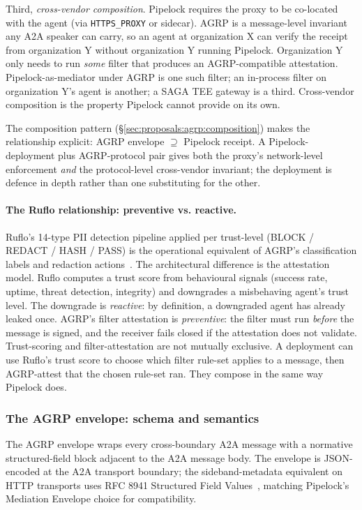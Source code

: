Third, \emph{cross-vendor composition}. Pipelock requires
the proxy to be co-located with the agent (via
\texttt{HTTPS\_PROXY} or sidecar). AGRP is a message-level
invariant any A2A speaker can carry, so an agent at
organization X can verify the receipt from organization
Y without organization Y running Pipelock. Organization Y
only needs to run \emph{some} filter that produces an
AGRP-compatible attestation. Pipelock-as-mediator under
AGRP is one such filter; an in-process filter on
organization Y's agent is another; a SAGA TEE gateway is
a third. Cross-vendor composition is the property
Pipelock cannot provide on its own.

The composition pattern (\S\ref{sec:proposals:agrp:composition})
makes the relationship explicit: AGRP envelope
$\supseteq$ Pipelock receipt. A
Pipelock-deployment plus AGRP-protocol pair gives both
the proxy's network-level enforcement \emph{and} the
protocol-level cross-vendor invariant; the deployment is
defence in depth rather than one substituting for the
other.

\paragraph{The Ruflo relationship: preventive vs. reactive.}
Ruflo's 14-type PII detection pipeline applied per
trust-level (BLOCK / REDACT / HASH / PASS) is the
operational equivalent of AGRP's classification labels
and redaction actions~\cite{ruflo}. The architectural
difference is the attestation model. Ruflo computes a
trust score from behavioural signals (success rate,
uptime, threat detection, integrity) and downgrades a
misbehaving agent's trust level. The downgrade is
\emph{reactive}: by definition, a downgraded agent
has already leaked once. AGRP's filter attestation is
\emph{preventive}: the filter must run \emph{before} the
message is signed, and the receiver fails closed if the
attestation does not validate. Trust-scoring and
filter-attestation are not mutually exclusive. A
deployment can use Ruflo's trust score to choose which
filter rule-set applies to a message, then AGRP-attest
that the chosen rule-set ran. They compose in the same
way Pipelock does.

\subsubsection{The AGRP envelope: schema and semantics}
\label{sec:proposals:agrp:schema}

The AGRP envelope wraps every cross-boundary A2A message
with a normative structured-field block adjacent to the
A2A message body. The envelope is JSON-encoded at the
A2A transport boundary; the sideband-metadata equivalent
on HTTP transports uses RFC 8941 Structured Field
Values~\cite{rfc8941}, matching Pipelock's Mediation
Envelope choice for compatibility.

